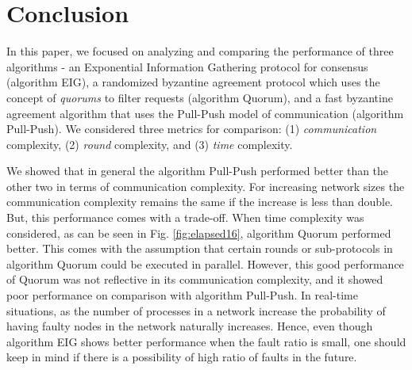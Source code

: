 ﻿\section{Conclusion}
\label{sec:conc}

In this paper, we focused on analyzing and comparing the performance of three algorithms - an Exponential Information Gathering protocol for consensus \cite{KM13} (algorithm EIG), a randomized byzantine agreement protocol which uses the concept of \textit{quorums} to filter requests \cite{BPV06} (algorithm Quorum), and a fast byzantine agreement algorithm that uses the Pull-Push model of communication \cite{BGH13} (algorithm Pull-Push). We considered three metrics for comparison: (1) \textit{communication} complexity, (2) \textit{round} complexity, and (3) \textit{time} complexity. 

We showed that in general the algorithm Pull-Push performed better than the other two in terms of communication complexity. For increasing network sizes the communication complexity remains the same if the increase is less than double. But, this performance comes with a trade-off. When time complexity was considered, as can be seen in Fig. \ref{fig:elapsed16}, algorithm Quorum performed better. This comes with the assumption that certain rounds or sub-protocols in algorithm Quorum could be executed in parallel. However, this good performance of Quorum was not reflective in its communication complexity, and it showed poor performance on comparison with algorithm Pull-Push. In real-time situations, as the number of processes in a network increase the probability of having faulty nodes in the network naturally increases. Hence, even though algorithm EIG shows better performance when the fault ratio is small, one should keep in mind if there is a possibility of high ratio of faults in the future.

